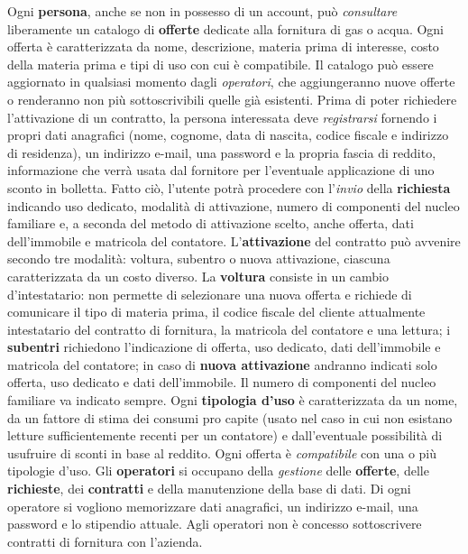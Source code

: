 \documentclass[a4paper,12pt]{report}
\begin{document}
\begin{mdframed}
Ogni \textbf{persona}, anche se non in possesso di un account, può \textit{consultare} liberamente un catalogo di \textbf{offerte} dedicate alla fornitura di gas o acqua. Ogni offerta è caratterizzata da nome, descrizione, materia prima di interesse, costo della materia prima e tipi di uso con cui è compatibile. Il catalogo può essere aggiornato in qualsiasi momento dagli \textit{operatori}, che aggiungeranno nuove offerte o renderanno non più sottoscrivibili quelle già esistenti.
\newline
Prima di poter richiedere l'attivazione di un contratto, la persona interessata deve \textit{registrarsi} fornendo i propri dati anagrafici (nome, cognome, data di nascita, codice fiscale e indirizzo di residenza), un indirizzo e-mail, una password e la propria fascia di reddito, informazione che verrà usata dal fornitore per l'eventuale applicazione di uno sconto in bolletta. Fatto ciò, l'utente potrà procedere con l'\textit{invio} della \textbf{richiesta} indicando uso dedicato, modalità di attivazione, numero di componenti del nucleo familiare e, a seconda del metodo di attivazione scelto, anche offerta, dati dell'immobile e matricola del contatore.
\newline
L'\textbf{attivazione} del contratto può avvenire secondo tre modalità: voltura, subentro o nuova attivazione, ciascuna caratterizzata da un costo diverso. La \textbf{voltura} consiste in un cambio d'intestatario: non permette di selezionare una nuova offerta e richiede di comunicare il tipo di materia prima, il codice fiscale del cliente attualmente intestatario del contratto di fornitura, la matricola del contatore e una lettura; i \textbf{subentri} richiedono l'indicazione di offerta, uso dedicato, dati dell'immobile e matricola del contatore; in caso di \textbf{nuova attivazione} andranno indicati solo offerta, uso dedicato e dati dell'immobile. Il numero di componenti del nucleo familiare va indicato sempre.
\newline
Ogni \textbf{tipologia d'uso} è caratterizzata da un nome, da un fattore di stima dei consumi pro capite (usato nel caso in cui non esistano letture sufficientemente recenti per un contatore) e dall'eventuale possibilità di usufruire di sconti in base al reddito. Ogni offerta è \textit{compatibile} con una o più tipologie d'uso.
\newline
Gli \textbf{operatori} si occupano della \textit{gestione} delle \textbf{offerte}, delle \textbf{richieste}, dei \textbf{contratti} e della manutenzione della base di dati. Di ogni operatore si vogliono memorizzare dati anagrafici, un indirizzo e-mail, una password e lo stipendio attuale. Agli operatori non è concesso sottoscrivere contratti di fornitura con l'azienda.

\end{mdframed}
\end{document}
